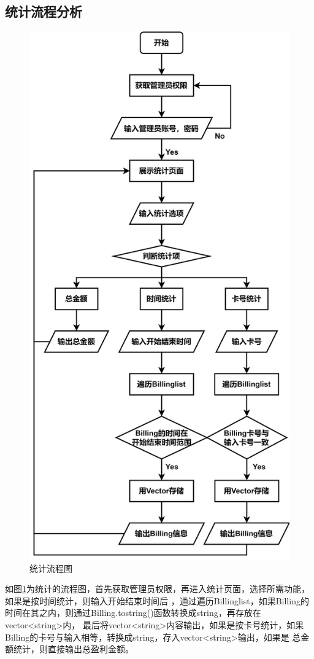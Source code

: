 \documentclass{article}
\begin{document}
    \subsection{统计流程分析}
    \begin{figure}[h]
        \centering
        \includegraphics[scale=0.09]{figure/count_pic.png}
        \caption{统计流程图}
        \label{count_pic}
    \end{figure}
    如图\ref{count_pic}为统计的流程图，首先获取管理员权限，再进入统计页面，选择所需功能，如果是按时间统计，则输入开始结束时间后
    ，通过遍历Billinglist，如果Billing的时间在其之内，则通过Billing.tostring()函数转换成string，再存放在vector<string>内，
    最后将vector<string>内容输出，如果是按卡号统计，如果Billing的卡号与输入相等，转换成string，存入vector<string>输出，如果是
    总金额统计，则直接输出总盈利金额。
    \newpage
\end{document}

